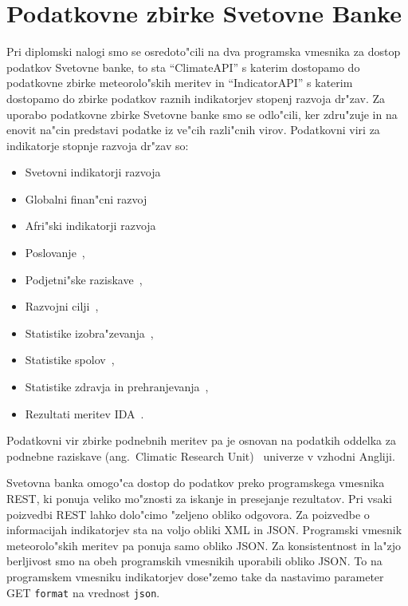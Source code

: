 \chapter{Podatkovne zbirke Svetovne Banke}

Pri diplomski nalogi smo se osredoto"cili na dva programska vmesnika za dostop 
podatkov Svetovne banke, to sta ``ClimateAPI'' s katerim dostopamo do 
podatkovne zbirke meteorolo"skih meritev in ``IndicatorAPI'' s katerim dostopamo do 
zbirke podatkov raznih indikatorjev stopenj razvoja dr"zav.
Za uporabo podatkovne zbirke Svetovne banke smo se odlo"cili, ker zdru"zuje in na
enovit na"cin predstavi podatke iz ve"cih razli"cnih virov. Podatkovni viri za 
indikatorje stopnje razvoja dr"zav so:
\begin{itemize}  
  \item Svetovni indikatorji razvoja~\cite{world_dev_ind} %
  \item Globalni finan"cni razvoj~\cite{glob_fin_dev}
  \item Afri"ski indikatorji razvoja~\cite{africa_dev_ind}
  \item Poslovanje~\cite{doing_buseness},
  \item Podjetni"ske raziskave~\cite{ent_surveys}, 
  \item Razvojni cilji~\cite{mil_dev_goals}, 
  \item Statistike izobra"zevanja~\cite{edu_stat}, 
  \item Statistike spolov~\cite{gen_stat},
  \item Statistike zdravja in prehranjevanja~\cite{health_pop_stat},
  \item Rezultati meritev IDA~\cite{ida_res_mes_sys}.
\end{itemize}  

Podatkovni vir zbirke podnebnih meritev pa je osnovan na podatkih oddelka
za podnebne raziskave (ang.\ Climatic Research Unit)~\cite{climate_data}
univerze v vzhodni Angliji.

Svetovna banka omogo"ca dostop do podatkov preko programskega vmesnika REST, ki
ponuja veliko mo"znosti za iskanje in presejanje rezultatov. Pri vsaki 
poizvedbi REST lahko dolo"cimo "zeljeno obliko odgovora. Za poizvedbe o 
informacijah indikatorjev sta na voljo obliki XML in JSON. Programski vmesnik 
meteorolo"skih meritev pa ponuja samo obliko JSON. Za konsistentnost in la"zjo
berljivost smo na obeh programskih vmesnikih uporabili obliko JSON. To na
programskem vmesniku indikatorjev dose"zemo take da nastavimo parameter GET
\verb|format| na vrednost \verb|json|. 


